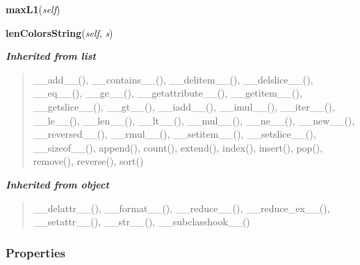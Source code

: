 \hspace{.8\funcindent}\begin{boxedminipage}{\funcwidth}

    \raggedright \textbf{maxL1}(\textit{self})

\setlength{\parskip}{2ex}
\setlength{\parskip}{1ex}
    \end{boxedminipage}

    \label{displayShip:InfosBoth:lenColorsString}

    \vspace{0.5ex}

\hspace{.8\funcindent}\begin{boxedminipage}{\funcwidth}

    \raggedright \textbf{lenColorsString}(\textit{self}, \textit{s})

\setlength{\parskip}{2ex}
\setlength{\parskip}{1ex}
    \end{boxedminipage}


\large{\textbf{\textit{Inherited from list}}}

\begin{quote}
\_\_add\_\_(), \_\_contains\_\_(), \_\_delitem\_\_(), \_\_delslice\_\_(), \_\_eq\_\_(), \_\_ge\_\_(), \_\_getattribute\_\_(), \_\_getitem\_\_(), \_\_getslice\_\_(), \_\_gt\_\_(), \_\_iadd\_\_(), \_\_imul\_\_(), \_\_iter\_\_(), \_\_le\_\_(), \_\_len\_\_(), \_\_lt\_\_(), \_\_mul\_\_(), \_\_ne\_\_(), \_\_new\_\_(), \_\_reversed\_\_(), \_\_rmul\_\_(), \_\_setitem\_\_(), \_\_setslice\_\_(), \_\_sizeof\_\_(), append(), count(), extend(), index(), insert(), pop(), remove(), reverse(), sort()
\end{quote}

\large{\textbf{\textit{Inherited from object}}}

\begin{quote}
\_\_delattr\_\_(), \_\_format\_\_(), \_\_reduce\_\_(), \_\_reduce\_ex\_\_(), \_\_setattr\_\_(), \_\_str\_\_(), \_\_subclasshook\_\_()
\end{quote}


  \subsubsection{Properties}

